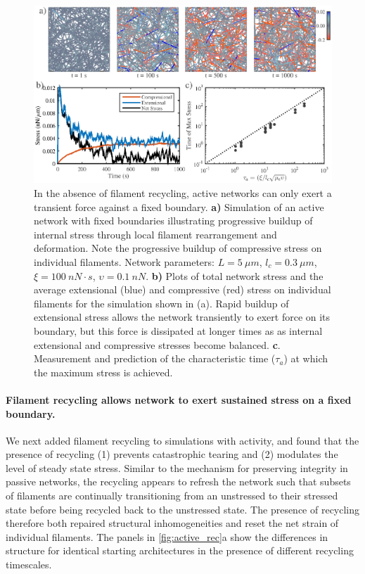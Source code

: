 \documentclass[10pt,letterpaper]{article}
\begin{document}
\begin{figure}[h!]
	\centering
	\includegraphics[width=\hsize]{figures/figure4b}
	\caption{\label{fig:active_str} In the absence of filament recycling, active networks can only exert a transient force against a fixed boundary.  \textbf{a)} Simulation of an active network with fixed boundaries illustrating progressive buildup of internal stress through local filament rearrangement and deformation. Note the progressive buildup of compressive stress on individual filaments. Network parameters: $L=5\: \mu m$, $l_c=0.3\: \mu m$, $\xi=100\: nN\cdot s$, $\upsilon=0.1\: nN$.  \textbf{b)} Plots of total network stress and the average extensional (blue) and compressive (red) stress on individual filaments for the simulation shown in (a). Rapid buildup of extensional stress allows the network transiently to exert force on its boundary, but this force is dissipated at longer times as   as internal extensional and compressive stresses become balanced. \textbf{c}. Measurement and prediction of the characteristic time ($\tau_a$) at which the maximum stress is achieved. }
\end{figure}

\paragraph{Filament recycling allows network to exert sustained stress on a fixed boundary.}


We next added filament recycling to simulations with activity, and found that the presence of recycling (1) prevents catastrophic tearing and (2) modulates the level of steady state stress.  Similar to the mechanism for preserving integrity in passive networks, the recycling appears to refresh the network such that subsets of filaments are continually transitioning from an unstressed to their stressed state before being recycled back to the unstressed state.  The presence of recycling therefore both repaired structural inhomogeneities and reset the net strain of individual filaments. The panels in \ref{fig:active_rec}a show the differences in structure for identical starting architectures in the presence of different recycling timescales.  
\end{document}

